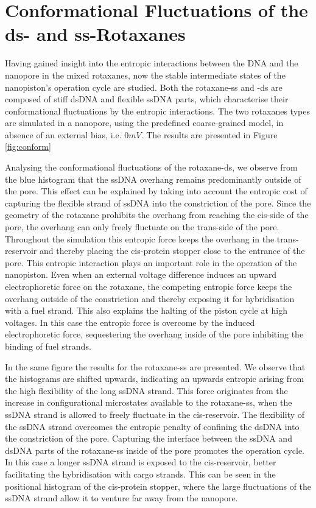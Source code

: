 \section{Conformational Fluctuations of the ds- and ss-Rotaxanes}
\vspace{-0.2cm}

Having gained insight into the entropic interactions between the DNA and the
nanopore in the mixed rotaxanes, now the stable intermediate states of the nanopiston's
operation cycle are
studied. Both the rotaxane-ss and -ds are composed of stiff dsDNA and flexible ssDNA
parts, which characterise their conformational fluctuations by the entropic interactions.
The two rotaxanes types are simulated in a nanopore, using the predefined coarse-grained
model, in absence of an external bias, i.e.  $0mV$. The results are presented in Figure
\ref{fig:conform}

Analysing the conformational fluctuations of the rotaxane-ds, we observe from the blue
histogram that the ssDNA
overhang remains predominantly outside of the pore. This effect can be explained by
taking
into account the entropic cost of capturing the flexible strand of ssDNA into the
constriction of the pore. Since the geometry of the rotaxane prohibits the overhang from
reaching the cis-side of the pore, the overhang can only freely fluctuate on the
trans-side of the pore. Throughout the simulation this entropic force keeps the overhang
in the trans-reservoir and thereby placing the cis-protein stopper close to the entrance
of the pore. This entropic interaction plays an important role in the operation of the
nanopiston. Even when an external voltage difference induces an upward electrophoretic
force on the rotaxane, the competing entropic force keeps the overhang outside of the
constriction and thereby exposing it for hybridisation with a fuel strand. This also
explains the halting of the piston cycle at high voltages. In this case the entropic
force is overcome by the induced electrophoretic force, sequestering the overhang inside
of the pore inhibiting the binding of fuel strands.

In the same figure the results for the rotaxane-ss are presented. We observe that the
histograms are shifted upwards, indicating an upwards entropic arising from the high
flexibility of the long ssDNA strand. This force originates from the increase in
configurational microstates available to the rotaxane-ss, when the ssDNA strand is
allowed to freely fluctuate in the
cis-reservoir. The flexibility of the ssDNA strand overcomes the entropic penalty of
confining the dsDNA into the constriction of the pore. Capturing the interface between
the ssDNA and dsDNA parts of the rotaxane-ss inside of the pore promotes the
operation cycle. In this case a longer ssDNA strand is exposed to the cis-reservoir,
better facilitating the hybridisation with cargo strands. This can be seen in the
positional histogram of the cis-protein stopper, where the large fluctuations of the
ssDNA strand allow it to venture far away from the nanopore.

